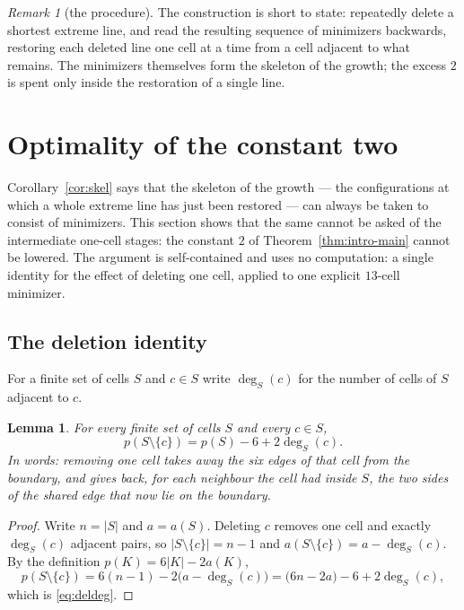 \documentclass[11pt]{article}
\theoremstyle{plain}
\newtheorem{lemma}[theorem]{Lemma}
\theoremstyle{definition}
\theoremstyle{remark}
\newtheorem{remark}[theorem]{Remark}
\newcommand{\sm}{\setminus}
\newcommand{\dg}{\operatorname{deg}}
\begin{document}
\begin{remark}[the procedure]\label{rem:algorithm}
The construction is short to state: repeatedly delete a shortest extreme line, and read the
resulting sequence of minimizers backwards, restoring each deleted line one cell at a time
from a cell adjacent to what remains. The minimizers themselves form the skeleton of the
growth; the excess \(2\) is spent only inside the restoration of a single line.
\end{remark}


\section{Optimality of the constant two}\label{sec:sharp}

Corollary~\ref{cor:skel} says that the skeleton of the growth --- the configurations at
which a whole extreme line has just been restored --- can always be taken to consist of
minimizers. This section shows that the same cannot be asked of the intermediate one-cell
stages: the constant \(2\) of Theorem~\ref{thm:intro-main} cannot be lowered. The argument
is self-contained and uses no computation: a single identity for the effect of deleting one
cell, applied to one explicit \(13\)-cell minimizer.

\subsection{The deletion identity}\label{sec:8.1}

For a finite set of cells \(S\) and \(c\in S\) write \(\dg_{S}(c)\) for the number of cells
of \(S\) adjacent to \(c\).

\begin{lemma}\label{lem:deldeg}
For every finite set of cells \(S\) and every \(c\in S\),
\begin{equation}\label{eq:deldeg}
   p(S\sm\{c\})=p(S)-6+2\dg_{S}(c) .
\end{equation}
In words: removing one cell takes away the six edges of that cell from the boundary, and
gives back, for each neighbour the cell had inside \(S\), the two sides of the shared edge
that now lie on the boundary.
\end{lemma}

\begin{proof}
Write \(n=|S|\) and \(a=a(S)\). Deleting \(c\) removes one cell and exactly
\(\dg_{S}(c)\) adjacent pairs, so \(|S\sm\{c\}|=n-1\) and
\(a(S\sm\{c\})=a-\dg_{S}(c)\). By the definition \(p(K)=6|K|-2a(K)\),
\[
   p(S\sm\{c\})=6(n-1)-2\bigl(a-\dg_{S}(c)\bigr)=\bigl(6n-2a\bigr)-6+2\dg_{S}(c),
\]
which is \eqref{eq:deldeg}.
\end{proof}
\end{document}
